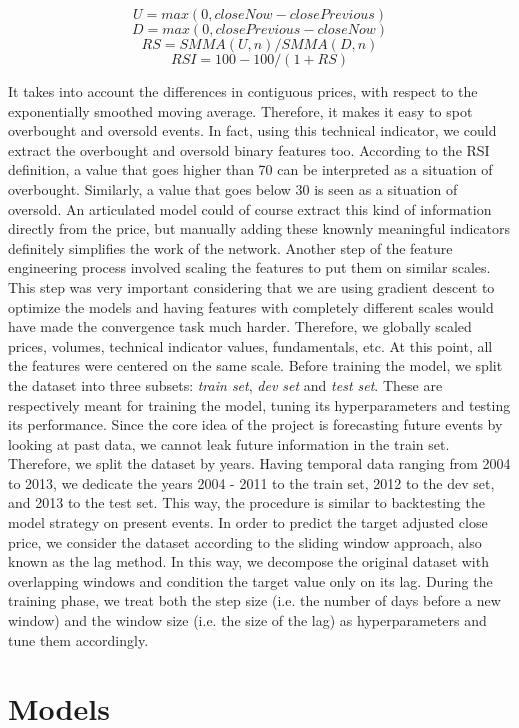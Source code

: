 \documentclass{article}
\begin{document}
$$
U = max(0, closeNow - closePrevious)
$$
$$
D = max(0, closePrevious - closeNow)
$$
$$
RS = SMMA(U,n)/SMMA(D,n)
$$
$$
RSI = 100 - 100/(1+RS)
$$

It takes into account the differences in contiguous prices, with respect to the
exponentially smoothed moving average. Therefore, it makes it easy to spot overbought
and oversold events. In fact, using this technical indicator, we could extract the
overbought and oversold binary features too. According to the RSI definition,
a value that goes higher than 70 can be interpreted as a situation of overbought.
Similarly, a value that goes below 30 is seen as a situation of oversold. An articulated
model could of course extract this kind of information directly from the price, but manually
adding these knownly meaningful indicators definitely simplifies the work of the network.
Another step of the feature engineering process involved scaling the features to put them
on similar scales. This step was very important considering that we are using gradient
descent to optimize the models and having features with completely different scales would
have made the convergence task much harder. Therefore, we globally scaled prices,
volumes, technical indicator values, fundamentals, etc. At this point, all the features
were centered on the same scale.
Before training the model, we split the dataset into three subsets: \emph{train set},
\emph{dev set} and \emph{test set}. These are respectively meant for training the model,
tuning its hyperparameters and testing its performance. Since the core idea of the project
is forecasting future events by looking at past data, we cannot leak future information in
the train set. Therefore, we split the dataset by years. Having temporal data ranging from
2004 to 2013, we dedicate the years 2004 - 2011 to the train set, 2012 to the dev set, and
2013 to the test set. This way, the procedure is similar to backtesting the model strategy
on present events.
In order to predict the target adjusted close price, we consider the dataset according to the sliding window approach, also known as the lag method. In this way, we decompose the original dataset with overlapping windows and condition the target value only on its lag. During the training phase, we treat both the step size (i.e. the number of days before a new window) and the window size (i.e. the size of the lag) as hyperparameters and tune them accordingly.

\section{Models}
\end{document}
